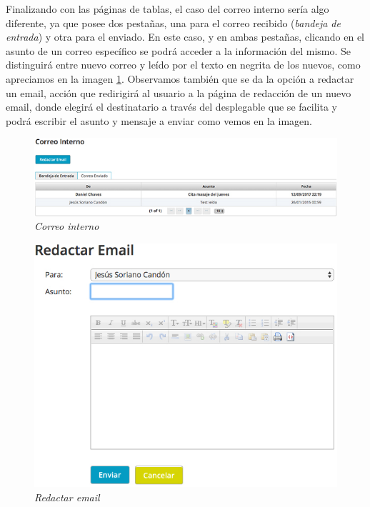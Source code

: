 Finalizando con las páginas de tablas, el caso del correo interno sería algo diferente, ya que posee dos pestañas, una para el correo recibido (\textit{bandeja de entrada}) y otra para el enviado. En este caso, y en ambas pestañas, clicando en el asunto de un correo específico se podrá acceder a la información del mismo. Se distinguirá entre nuevo correo y leído por el texto en negrita de los nuevos, como apreciamos en la imagen \ref{fig:correo-interno}. Observamos también que se da la opción a redactar un email, acción que redirigirá al usuario a la página de redacción de un nuevo email, donde elegirá el destinatario a través del desplegable que se facilita y podrá escribir el asunto y mensaje a enviar como vemos en la imagen. \\

\begin{figure}
\centering
  \includegraphics[scale=.60]{img/manual/correo-interno.jpg}
  \caption{\textit{Correo interno}}
  \label{fig:correo-interno}
\end{figure}

\begin{figure}
\centering
  \includegraphics[scale=.50]{img/manual/redactar-email.jpg}
  \caption{\textit{Redactar email}}
  \label{fig:redactar-email}
\end{figure}

